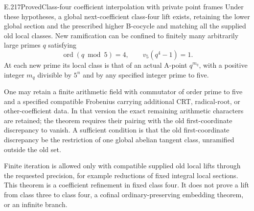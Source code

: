 \begin{result}{E.217}{Proved}{Class-four coefficient interpolation with private point frames}
Under these hypotheses, a global next-coefficient class-four lift exists, retaining the lower global section and the prescribed higher B-cocycle and matching all the supplied old local classes. New ramification can be confined to finitely many arbitrarily large primes $q$ satisfying
\[
 \operatorname{ord}(q\bmod5)=4,
 \qquad v_5(q^4-1)=1.
 \tag{1}
\]
At each new prime its local class is that of an actual A-point $q^{m_q}$, with a positive integer $m_q$ divisible by $5^n$ and by any specified integer prime to five.

One may retain a finite arithmetic field with commutator of order prime to five and a specified compatible Frobenius carrying additional CRT, radical-root, or other-coefficient data. In that version the exact remaining arithmetic characters are retained; the theorem requires their pairing with the old first-coordinate discrepancy to vanish. A sufficient condition is that the old first-coordinate discrepancy be the restriction of one global abelian tangent class, unramified outside the old set.

Finite iteration is allowed only with compatible supplied old local lifts through the requested precision, for example reductions of fixed integral local sections. This theorem is a coefficient refinement in fixed class four. It does not prove a lift from class three to class four, a cofinal ordinary-preserving embedding theorem, or an infinite branch.
\end{result}


